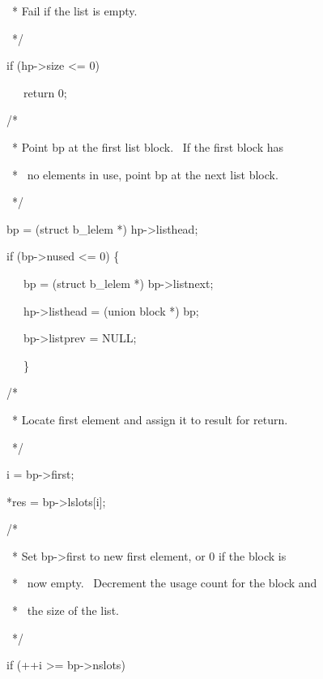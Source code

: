 {\ttfamily\mdseries
\ \ \ \ * Fail if the list is empty.}

{\ttfamily\mdseries
\ \ \ \ */}

{\ttfamily\mdseries
\ \ \ if (hp-{\textgreater}size {\textless}= 0)}

{\ttfamily\mdseries
\ \ \ \ \ \ return 0;}


\bigskip

{\ttfamily\mdseries
\ \ \ /*}

{\ttfamily\mdseries
\ \ \ \ * Point bp at the first list block. \ If the first block has}

{\ttfamily\mdseries
\ \ \ \ * \ no elements in use, point bp at the next list block.}

{\ttfamily\mdseries
\ \ \ \ */}

{\ttfamily\mdseries
\ \ \ bp = (struct b\_lelem *) hp-{\textgreater}listhead;}

{\ttfamily\mdseries
\ \ \ if (bp-{\textgreater}nused {\textless}= 0) \{}

{\ttfamily\mdseries
\ \ \ \ \ \ bp = (struct b\_lelem *) bp-{\textgreater}listnext;}

{\ttfamily\mdseries
\ \ \ \ \ \ hp-{\textgreater}listhead = (union block *) bp;}

{\ttfamily\mdseries
\ \ \ \ \ \ bp-{\textgreater}listprev = NULL;}

{\ttfamily\mdseries
\ \ \ \ \ \ \}}


\bigskip

{\ttfamily\mdseries
\ \ \ /*}

{\ttfamily\mdseries
\ \ \ \ * Locate first element and assign it to result for return.}

{\ttfamily\mdseries
\ \ \ \ */}

{\ttfamily\mdseries
\ \ \ i = bp-{\textgreater}first;}

{\ttfamily\mdseries
\ \ \ *res = bp-{\textgreater}lslots[i];}


\bigskip

{\ttfamily\mdseries
\ \ \ /*}

{\ttfamily\mdseries
\ \ \ \ * Set bp-{\textgreater}first to new first element, or 0 if the block is}

{\ttfamily\mdseries
\ \ \ \ * \ now empty. \ Decrement the usage count for the block and}

{\ttfamily\mdseries
\ \ \ \ * \ the size of the list.}

{\ttfamily\mdseries
\ \ \ \ */}

{\ttfamily\mdseries
\ \ \ if (++i {\textgreater}= bp-{\textgreater}nslots)}

